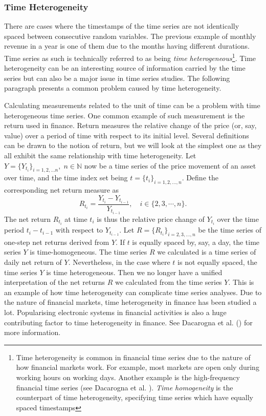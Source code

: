 \subsubsection{Time Heterogeneity}
There are cases where the timestamps of the time series are not identically spaced between consecutive random variables. The previous example of monthly revenue in a year is one of them due to the months having different durations. Time series as such is technically referred to as being \textit{time heterogeneous}\footnote{Time heterogeneity is common in financial time series due to the nature of how financial markets work. For example, most markets are open only during working hours on working days. Another example is the high-frequency financial time series (see Dacarogna et al. \citeyear{genccay2001introduction}). \textit{Time homogeneity} is the counterpart of time heterogeneity, specifying time series which have equally spaced timestamps}. Time heterogeneity can be an interesting source of information carried by the time series but can also be a major issue in time series studies. The following paragraph presents a common problem caused by time heterogeneity.

Calculating measurements related to the unit of time can be a problem with time heterogeneous time series. One common example of such measurement is the return used in finance. Return measures the relative change of the price (or, say, value) over a period of time with respect to its initial level. Several definitions can be drawn to the notion of return, but we will look at the simplest one as they all exhibit the same relationship with time heterogeneity. Let $Y = \{ Y_{t_i} \}_{i = 1, 2, \ldots n}, \; n \in \mathbb{N}$ now be a time series of the price movement of an asset over time, and the time index set being $t = \{ t_i \}_{i = 1, 2, \ldots, n}$. Define the corresponding net return measure as
\begin{equation}\label{eq: return}
R_{t_i} = \frac{Y_{t_i} - Y_{t_{i-1}}}{Y_{t_{i-1}}}, \quad i \in \{2, 3, \cdots, n \}.
\end{equation}
The net return $R_{t_i}$ at time $t_i$ is thus the relative price change of $Y_{t_i}$ over the time period $t_i - t_{i-1}$ with respect to $Y_{t_{i-1}}$. Let $R = \{ R_{t_i} \}_{i = 2, 3, \ldots, n}$ be the time series of one-step net returns derived from $Y$. If $t$ is equally spaced by, say, a day, the time series $Y$ is time-homogeneous. The time series $R$ we calculated is a time series of daily net return of $Y$. Nevertheless, in the case where $t$ is not equally spaced, the time series $Y$ is time heterogeneous. Then we no longer have a unified interpretation of the net returns $R$ we calculated from the time series $Y$. This is an example of how time heterogeneity can complicate time series analyses. Due to the nature of financial markets, time heterogeneity in finance has been studied a lot. Popularising electronic systems in financial activities is also a huge contributing factor to time heterogeneity in finance. See Dacarogna et al. (\citeyear{genccay2001introduction}) for more information.

